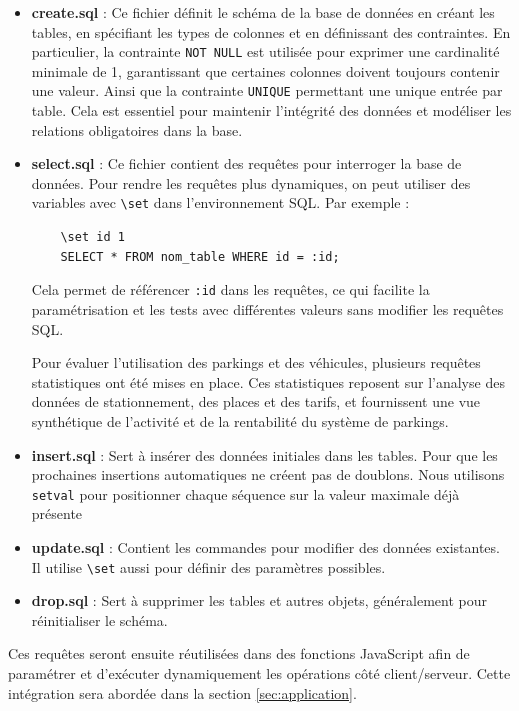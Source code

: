 \documentclass[a4paper,12pt]{report}
\begin{document}
\begin{itemize}
    \item \textbf{create.sql} : Ce fichier définit le schéma de la base de données en créant les tables, en spécifiant les types de colonnes et en définissant des contraintes. En particulier, la contrainte \texttt{NOT NULL} est utilisée pour exprimer une cardinalité minimale de 1, garantissant que certaines colonnes doivent toujours contenir une valeur. Ainsi que la contrainte \texttt{UNIQUE} permettant une unique entrée par table. Cela est essentiel pour maintenir l'intégrité des données et modéliser les relations obligatoires dans la base.
    
    \item \textbf{select.sql} : Ce fichier contient des requêtes pour interroger la base de données. Pour rendre les requêtes plus dynamiques, on peut utiliser des variables avec \texttt{\textbackslash set} dans l'environnement SQL. Par exemple :
    \begin{verbatim}
    \set id 1
    SELECT * FROM nom_table WHERE id = :id;
    \end{verbatim}
    Cela permet de référencer \texttt{:id} dans les requêtes, ce qui facilite la paramétrisation et les tests avec différentes valeurs sans modifier les requêtes SQL.

    Pour évaluer l’utilisation des parkings et des véhicules, plusieurs requêtes statistiques ont été mises en place. 
    Ces statistiques reposent sur l’analyse des données de stationnement, des places et des tarifs, et fournissent une vue synthétique de l’activité et de la rentabilité du système de parkings.

    
    \item \textbf{insert.sql} : Sert à insérer des données initiales dans les tables. Pour que les prochaines insertions automatiques ne créent pas de doublons. Nous utilisons \texttt{setval} pour positionner chaque séquence sur la valeur maximale déjà présente
    
    \item \textbf{update.sql} : Contient les commandes pour modifier des données existantes. Il utilise \texttt{\textbackslash set} aussi pour définir des paramètres possibles.
    
    \item \textbf{drop.sql} : Sert à supprimer les tables et autres objets, généralement pour réinitialiser le schéma.
\end{itemize}

Ces requêtes seront ensuite réutilisées dans des fonctions JavaScript afin de paramétrer et d’exécuter dynamiquement les opérations côté client/serveur. Cette intégration sera abordée dans la section \ref{sec:application}.
\end{document}
